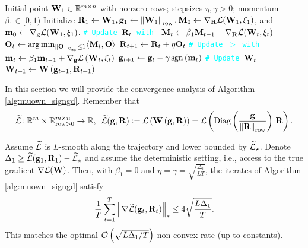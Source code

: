 
{
\begin{algorithm}[t]
    \caption{\algname{} (\signsgd\ Version)}\label{alg:muown_signgd}
    {\linespread{1.3}\selectfont
    \begin{algorithmic}
    \Require Initial point $\mathbf{W}_1 \in \mathbb{R}^{m\times n}$ with nonzero rows; stepsizes $\eta, \gamma>0$; momentum $\beta_1\in[0,1)$
    \State Initialize $\mathbf{R}_1 \gets \mathbf{W}_1, \mathbf{g}_1 \gets \left \| \mathbf{W}_1 \right\|_{\mathrm{row}}, \mathbf{M}_0 \gets \nabla_{\mathbf{R}} \mathcal L(\mathbf{W}_1, \xi_1)$, and $\mathbf{m}_0 \gets \nabla_{\mathbf{g}} \mathcal L (\mathbf{W}_1, \xi_1)$.
        \State \textcolor{cyan}{\texttt{\# Update $\mathbf{R}_t$ with \muon}}
        \State $\mathbf{M}_t \gets \beta_1 \mathbf{M}_{t-1} + \nabla_{\mathbf{R}} \mathcal L(\mathbf{W}_t, \xi_t)$
        \State $\Ot \gets \arg\min_{\opnorm{\Obf} \leq 1} \langle \Mt, \Obf \rangle$
        \State $\mathbf{R}_{t+1} \gets \mathbf{R}_t + \eta \mathbf{O}_t$
        \State
        \State \textcolor{cyan}{\texttt{\# Update $\gt$ with \signsgd}}
        \State $\mathbf{m}_t \gets \beta_1 \mathbf{m}_{t-1} + \nabla_{\mathbf{g}} \mathcal L\left( \mathbf{W}_t, \xi_t \right)$
        \State $\mathbf{g}_{t+1} \gets \mathbf{g}_t - \gamma \operatorname{sgn}\left( \mathbf{m}_t \right)$
        \State
        \State \textcolor{cyan}{\texttt{\# Update $\mathbf{W}_t$}}
        \State $\mathbf{W}_{t+1} \gets \mathbf{W}\left( \mathbf{g}_{t+1}, \mathbf{R}_{t+1} \right)$
    \EndFor
    \end{algorithmic}
    }
\end{algorithm}

\renewcommand{\opnorm}[1]{\norm{#1}_{S_\infty}}
In this section we will provide the convergence analysis of Algorithm \ref{alg:muown_signgd}. Remember that 
\begin{equation*}
    \widetilde {\mathcal{L}} \colon \mathbb{R}^m \times \mathbb{R}^{m \times n}_{\text{row} > 0} \to \mathbb{R},\ \, \widetilde {\mathcal{L}}(\mathbf{g},\mathbf{R}) := \mathcal L\left( \mathbf{W}\left( \mathbf{g}, \mathbf{R} \right) \right) = \mathcal L\left(\operatorname{Diag}\left(\frac{\mathbf{g}}{\left \| \mathbf{R} \right\|_{\mathrm{row}}}\right)\, \mathbf{R}\right).
\end{equation*}

\begin{theorem}\label{thm:det_convergence}
    Assume $\widetilde {\mathcal{L}}$ is $L$-smooth along the trajectory and lower bounded by $\widetilde {\mathcal{L}}_\star$. Denote $\Delta_1 \geq \widetilde {\mathcal{L}}(\mathbf{g}_1, \mathbf{R}_1) - \widetilde {\mathcal{L}}_\star$ and assume the deterministic setting, i.e., access to the true gradient $\nabla \mathcal L(\mathbf{W})$. 
    Then, with $\beta_1 = 0$ and $\eta = \gamma = \sqrt{\frac{\Delta_1}{LT}}$, the iterates of Algorithm \ref{alg:muown_signgd} satisfy
    \begin{equation*}
        \frac 1 T \sum_{t=1}^T \left \| \nabla \widetilde {\mathcal{L}}(\mathbf{g}_t,\mathbf{R}_t) \right\|_* \leq 4\sqrt{\frac{L\Delta_1}{T}}.
    \end{equation*}
    This matches the optimal $\mathcal O\left( \sqrt{L\Delta_1/T} \right)$ non-convex rate (up to constants).
\end{theorem}

}
